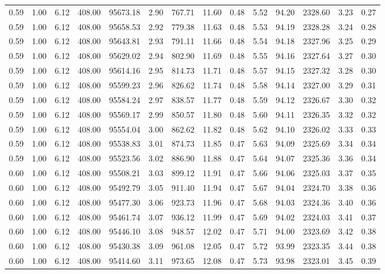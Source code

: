 \begin{table}[!ht]
\begin{tabular}{rrrrrrrrrrrrrr}
0.59 & 1.00 & 6.12 & 408.00 & 95673.18 & 2.90 & 767.71 & 11.60 & 0.48 & 5.52 & 94.20 & 2328.60 & 3.23 & 0.27 \\
0.59 & 1.00 & 6.12 & 408.00 & 95658.53 & 2.92 & 779.38 & 11.63 & 0.48 & 5.53 & 94.19 & 2328.28 & 3.24 & 0.28 \\
0.59 & 1.00 & 6.12 & 408.00 & 95643.81 & 2.93 & 791.11 & 11.66 & 0.48 & 5.54 & 94.18 & 2327.96 & 3.25 & 0.29 \\
0.59 & 1.00 & 6.12 & 408.00 & 95629.02 & 2.94 & 802.90 & 11.69 & 0.48 & 5.55 & 94.16 & 2327.64 & 3.27 & 0.30 \\
0.59 & 1.00 & 6.12 & 408.00 & 95614.16 & 2.95 & 814.73 & 11.71 & 0.48 & 5.57 & 94.15 & 2327.32 & 3.28 & 0.30 \\
0.59 & 1.00 & 6.12 & 408.00 & 95599.23 & 2.96 & 826.62 & 11.74 & 0.48 & 5.58 & 94.14 & 2327.00 & 3.29 & 0.31 \\
0.59 & 1.00 & 6.12 & 408.00 & 95584.24 & 2.97 & 838.57 & 11.77 & 0.48 & 5.59 & 94.12 & 2326.67 & 3.30 & 0.32 \\
0.59 & 1.00 & 6.12 & 408.00 & 95569.17 & 2.99 & 850.57 & 11.80 & 0.48 & 5.60 & 94.11 & 2326.35 & 3.32 & 0.32 \\
0.59 & 1.00 & 6.12 & 408.00 & 95554.04 & 3.00 & 862.62 & 11.82 & 0.48 & 5.62 & 94.10 & 2326.02 & 3.33 & 0.33 \\
0.59 & 1.00 & 6.12 & 408.00 & 95538.83 & 3.01 & 874.73 & 11.85 & 0.47 & 5.63 & 94.09 & 2325.69 & 3.34 & 0.34 \\
0.59 & 1.00 & 6.12 & 408.00 & 95523.56 & 3.02 & 886.90 & 11.88 & 0.47 & 5.64 & 94.07 & 2325.36 & 3.36 & 0.34 \\
0.60 & 1.00 & 6.12 & 408.00 & 95508.21 & 3.03 & 899.12 & 11.91 & 0.47 & 5.66 & 94.06 & 2325.03 & 3.37 & 0.35 \\
0.60 & 1.00 & 6.12 & 408.00 & 95492.79 & 3.05 & 911.40 & 11.94 & 0.47 & 5.67 & 94.04 & 2324.70 & 3.38 & 0.36 \\
0.60 & 1.00 & 6.12 & 408.00 & 95477.30 & 3.06 & 923.73 & 11.96 & 0.47 & 5.68 & 94.03 & 2324.36 & 3.40 & 0.36 \\
0.60 & 1.00 & 6.12 & 408.00 & 95461.74 & 3.07 & 936.12 & 11.99 & 0.47 & 5.69 & 94.02 & 2324.03 & 3.41 & 0.37 \\
0.60 & 1.00 & 6.12 & 408.00 & 95446.10 & 3.08 & 948.57 & 12.02 & 0.47 & 5.71 & 94.00 & 2323.69 & 3.42 & 0.38 \\
0.60 & 1.00 & 6.12 & 408.00 & 95430.38 & 3.09 & 961.08 & 12.05 & 0.47 & 5.72 & 93.99 & 2323.35 & 3.44 & 0.38 \\
0.60 & 1.00 & 6.12 & 408.00 & 95414.60 & 3.11 & 973.65 & 12.08 & 0.47 & 5.73 & 93.98 & 2323.01 & 3.45 & 0.39 \\

\end{tabular}
\end{table}
